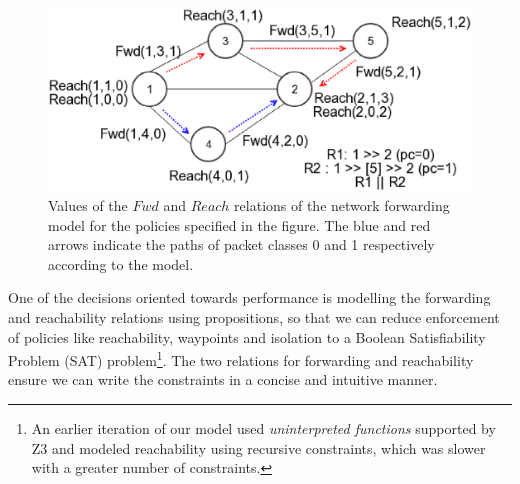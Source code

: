 \begin{figure}[!th]
	\centering
	\includegraphics[width=\columnwidth]{figures/network-model-example.eps}
	\caption{Values of the $Fwd$ and $Reach$ relations of the network forwarding model
		 for the policies specified in the figure. The blue and red arrows indicate the 
		 paths of packet classes 0 and 1 respectively according to the model.}
	\label{fig:model}
\end{figure}

One of the decisions oriented towards performance is modelling the forwarding and reachability relations using propositions, so that we can reduce enforcement of policies like reachability, waypoints and isolation to a Boolean Satisfiability Problem (SAT) problem\footnote{An earlier iteration of our model used \emph{uninterpreted functions} supported by Z3 and modeled reachability using recursive constraints, 
	which was slower with a greater number of constraints.}. 
The two relations for forwarding and reachability ensure we can write the constraints in a concise and intuitive manner.

